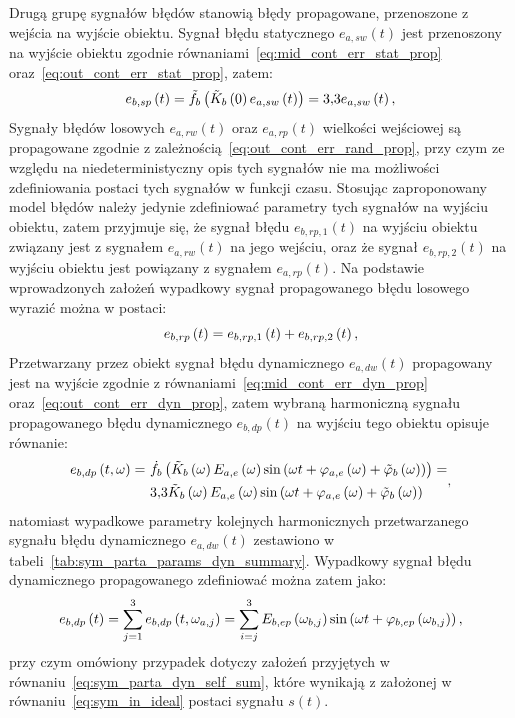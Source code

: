Drugą grupę sygnałów błędów stanowią błędy propagowane, przenoszone z wejścia na wyjście obiektu. Sygnał błędu statycznego $e_{a,sw}(t)$ jest przenoszony na wyjście obiektu zgodnie równaniami~\eqref{eq:mid_cont_err_stat_prop} oraz~\eqref{eq:out_cont_err_stat_prop}, zatem:
\begin{equation}
e_{b,sp} \left(t\right) = \tilde{f}_{b} \left( \tilde{K}_{b} \left(0\right) e_{a,sw} \left(t\right) \right) = \num{3.3} e_{a,sw} \left(t\right) \label{eq:sym_partb_stat_prop_err},
\end{equation}
Sygnały błędów losowych $e_{a,rw}(t)$ oraz $e_{a,rp}(t)$ wielkości wejściowej są propagowane zgodnie z zależnością~\eqref{eq:out_cont_err_rand_prop}, przy czym ze względu na niedeterministyczny opis tych sygnałów nie ma możliwości zdefiniowania postaci tych sygnałów w funkcji czasu. Stosując zaproponowany model błędów należy jedynie zdefiniować parametry tych sygnałów na wyjściu obiektu, zatem przyjmuje się, że sygnał błędu $e_{b,rp,1}(t)$ na wyjściu obiektu związany jest z sygnałem $e_{a,rw}(t)$ na jego wejściu, oraz że sygnał $e_{b,rp,2}(t)$ na wyjściu obiektu jest powiązany z sygnałem $e_{a,rp}(t)$. Na podstawie wprowadzonych założeń wypadkowy sygnał propagowanego błędu losowego wyrazić można w postaci:
\begin{equation}
e_{b,rp} \left(t\right) = e_{b,rp,1} \left(t\right) + e_{b,rp,2} \left(t\right) \label{eq:sym_partb_rand_prop_err},
\end{equation}
Przetwarzany przez obiekt sygnał błędu dynamicznego $e_{a,dw}(t)$ propagowany jest na wyjście zgodnie z równaniami~\eqref{eq:mid_cont_err_dyn_prop} oraz~\eqref{eq:out_cont_err_dyn_prop}, zatem wybraną harmoniczną sygnału propagowanego błędu dynamicznego $e_{b,dp}(t)$ na wyjściu tego obiektu opisuje równanie:
\begin{equation}
\begin{split}
e_{b,dp} \left(t,\omega\right) =~
& \dot{f}_{b} \left( \tilde{K}_{b} \left(\omega\right) E_{a,e} \left(\omega\right) \sin \left( \omega t + \varphi_{a,e} \left(\omega\right) + \tilde{\varphi}_{b} \left(\omega\right) \right) \right) = \\
& \num{3.3} \tilde{K}_{b} \left(\omega\right) E_{a,e} \left(\omega\right) \sin \left( \omega t + \varphi_{a,e} \left(\omega\right) + \tilde{\varphi}_{b} \left(\omega\right) \right)
\end{split}
\label{eq:sym_partb_dyn_prop_err},
\end{equation}
natomiast wypadkowe parametry kolejnych harmonicznych przetwarzanego sygnału błędu dynamicznego $e_{a,dw}(t)$ zestawiono w tabeli~\ref{tab:sym_parta_params_dyn_summary}. Wypadkowy sygnał błędu dynamicznego propagowanego zdefiniować można zatem jako:
\begin{equation}
e_{b,dp} \left(t\right) = \sum _{j = 1} ^{3} e_{b,dp} \left(t,\omega_{a,j}\right) = \sum _{i = j} ^{3} E_{b,ep} \left(\omega_{b,j}\right) \sin \left(\omega t + \varphi_{b,ep} \left(\omega_{b,j}\right)\right) \label{eq:sym_partb_dyn_prop_sum},
\end{equation}
przy czym omówiony przypadek dotyczy założeń przyjętych w równaniu~\eqref{eq:sym_parta_dyn_self_sum}, które wynikają z założonej w równaniu~\eqref{eq:sym_in_ideal} postaci sygnału $s(t)$.

